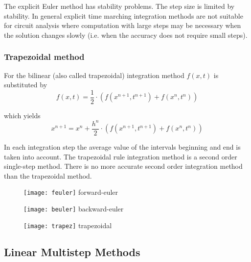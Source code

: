 \documentclass[10pt]{report}
\begin{document}
The explicit Euler method has stability problems.  The step size is
limited by stability.  In general explicit time marching integration
methods are not suitable for circuit analysis where computation with
large steps may be necessary when the solution changes slowly
(i.e. when the accuracy does not require small steps).

\subsubsection{Trapezoidal method}

For the bilinear (also called trapezoidal) integration method $f(x,t)$
is substituted by
\begin{equation}
f(x,t) = \dfrac{1}{2}\cdot \left(f(x^{n+1}, t^{n+1}) + f(x^{n}, t^{n})\right)
\end{equation}

which yields
\begin{equation}
\label{eq:TRInt}
x^{n+1} = x^n + \dfrac{h^n}{2}\cdot \left(f(x^{n+1}, t^{n+1}) + f(x^{n}, t^{n})\right)
\end{equation}

In each integration step the average value of the intervals beginning
and end is taken into account.  The trapezoidal rule integration
method is a second order single-step method.  There is no more
accurate second order integration method than the trapezoidal method.

\begin{center}
\begin{figure}[ht]
\begin{minipage}[t]{0.33\linewidth}
\centering
\texttt{[image: feuler]}
forward-euler
\end{minipage}
\begin{minipage}[t]{0.33\linewidth}
\centering
\texttt{[image: beuler]}
backward-euler
\end{minipage}
\begin{minipage}[t]{0.33\linewidth}
\centering
\texttt{[image: trapez]}
trapezoidal
\end{minipage}
\end{figure}
\FloatBarrier
\end{center}

\subsection{Linear Multistep Methods}
\end{document}
